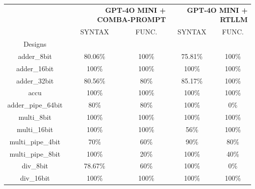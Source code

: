 \begin{tabular}{c|cc|cc}
\toprule
 & \multicolumn{2}{r}{\bfseries GPT‑4O MINI + COMBA-PROMPT} & \multicolumn{2}{r}{\bfseries GPT‑4O MINI + RTLLM} \\
 & SYNTAX & FUNC. & SYNTAX & FUNC. \\
Designs &  &  &  &  \\
\midrule
adder\_8bit & \color{black} {\cellcolor{lightblue}} 80.06\% & \color{black} {\cellcolor{lightgreen}} 100\% & 75.81\% & \color{black} {\cellcolor{lightgreen}} 100\% \\ \midrule
adder\_16bit & \color{black} {\cellcolor{lightblue}} 100\% & \color{black} {\cellcolor{lightgreen}} 100\% & \color{black} {\cellcolor{lightblue}} 100\% & \color{black} {\cellcolor{lightgreen}} 100\% \\ \midrule
adder\_32bit & 80.56\% & 80\% & \color{black} {\cellcolor{lightblue}} 85.17\% & \color{black} {\cellcolor{lightgreen}} 100\% \\ \midrule
accu & \color{black} {\cellcolor{lightblue}} 100\% & \color{black} {\cellcolor{lightgreen}} 100\% & \color{black} {\cellcolor{lightblue}} 100\% & \color{black} {\cellcolor{lightgreen}} 100\% \\ \midrule
adder\_pipe\_64bit & 80\% & \color{black} {\cellcolor{lightgreen}} 80\% & \color{black} {\cellcolor{lightblue}} 100\% & 0\% \\ \midrule
multi\_8bit & \color{black} {\cellcolor{lightblue}} 100\% & \color{black} {\cellcolor{lightgreen}} 100\% & \color{black} {\cellcolor{lightblue}} 100\% & \color{black} {\cellcolor{lightgreen}} 100\% \\ \midrule
multi\_16bit & \color{black} {\cellcolor{lightblue}} 100\% & \color{black} {\cellcolor{lightgreen}} 100\% & 56\% & \color{black} {\cellcolor{lightgreen}} 100\% \\ \midrule
multi\_pipe\_4bit & 70\% & 60\% & \color{black} {\cellcolor{lightblue}} 90\% & \color{black} {\cellcolor{lightgreen}} 80\% \\ \midrule
multi\_pipe\_8bit & \color{black} {\cellcolor{lightblue}} 100\% & 20\% & \color{black} {\cellcolor{lightblue}} 100\% & \color{black} {\cellcolor{lightgreen}} 40\% \\ \midrule
div\_8bit & 78.67\% & \color{black} {\cellcolor{lightgreen}} 60\% & \color{black} {\cellcolor{lightblue}} 100\% & 0\% \\ \midrule
div\_16bit & \color{black} {\cellcolor{lightblue}} 100\% & \color{black} {\cellcolor{lightgreen}} 100\% & \color{black} {\cellcolor{lightblue}} 100\% & \color{black} {\cellcolor{lightgreen}} 100\% \\ \midrule

\end{tabular}
